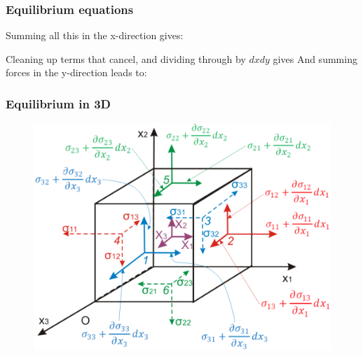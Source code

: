 \documentclass[beamer]{beamer}
\begin{document}
\begin{frame}
\frametitle{Equilibrium equations}
Summing all this in the x-direction gives:

Cleaning up terms that cancel, and dividing through by \(dx dy\) gives
	And summing forces in the y-direction leads to:
\end{frame}

\begin{frame}
\frametitle{Equilibrium in 3D}
 	\begin{figure}
		\includegraphics[width=0.8\linewidth]{figs/stress-equilibrium.png}
	\end{figure}
\end{frame}
\end{document}
